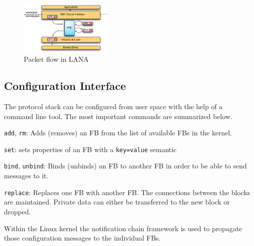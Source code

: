 \documentclass{sig-alternate}
\begin{document}

\begin{figure}
\centering
\includegraphics[width=0.4\textwidth]{figures/data_flow.pdf}
\caption{Packet flow in LANA}
\label{fig:architecture}
\end{figure}

\subsection{Configuration Interface}
The protocol stack can be configured from user space with the help of a 
command line tool. The most important commands are summarized below.
\begin{compactitem}
\item \texttt{add}, \texttt{rm}: Adds (removes) an FB from the 
      list of available FBs in the kernel. 
\item \texttt{set}: sets properties of an FB with a 
      \texttt{key=value} semantic
\item \texttt{bind}, \texttt{unbind}: Binds (unbinds) an FB 
      to another FB in order to be able to send messages to it. 
\item \texttt{replace}: Replaces one FB with another 
      FB. The connections between the blocks are maintained. 
      Private data can either be transferred to the new block or dropped.
\end{compactitem}
Within the Linux kernel the notification chain framework is used to propagate those configuration messages to the individual FBs. 
\end{document}
